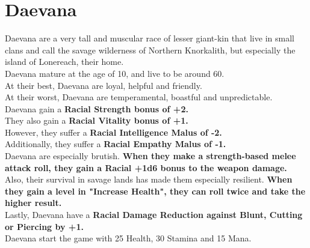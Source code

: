 \section{Daevana}\label{race:daevana}
Daevana are a very tall and muscular race of lesser giant-kin that live in small clans and call the savage wilderness of Northern Knorkalith, but especially the island of Lonereach, their home.\\
Daevana mature at the age of 10, and live to be around 60.\\
At their best, Daevana are loyal, helpful and friendly.\\
At their worst, Daevana are temperamental, boastful and unpredictable.\\
Daevana gain a \textbf{Racial Strength bonus of +2.}\\
They also gain a \textbf{Racial Vitality bonus of +1.}\\
However, they suffer a \textbf{Racial Intelligence Malus of -2.}\\
Additionally, they suffer a \textbf{Racial Empathy Malus of -1.}\\
Daevana are especially brutish. \textbf{When they make a strength-based melee attack roll, they gain a Racial +1d6 bonus to the weapon damage.}
Also, their survival in savage lands has made them especially resilient.
\textbf{When they gain a level in "Increase Health", they can roll twice and take the higher result.}\\
Lastly, Daevana have a \textbf{Racial Damage Reduction against Blunt, Cutting or Piercing by +1.}\\
Daevana start the game with 25 Health, 30 Stamina and 15 Mana.